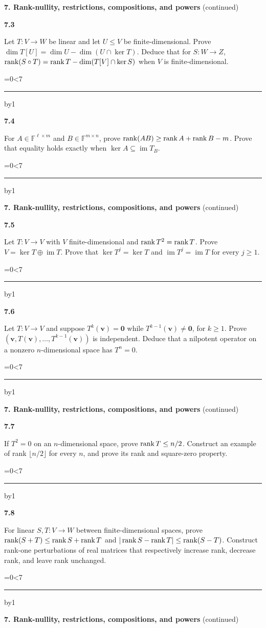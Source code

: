 \documentclass[11pt,letterpaper]{article}
\newcommand{\topicshort}{Problem collection}
\newcommand{\F}{\mathbb F}\newcommand{\R}{\mathbb R}\newcommand{\Q}{\mathbb Q}\newcommand{\C}{\mathbb C}\newcommand{\Z}{\mathbb Z}
\newcommand{\ruled}[1]{\par\begingroup\parskip=0pt\baselineskip=17pt\count255=0\loop\ifnum\count255<#1\noindent\textcolor{black!17}{\rule{\linewidth}{.25pt}}\par\advance\count255 by1\repeat\endgroup}
\newcommand{\problem}[4]{\noindent\begin{minipage}[t][3.48in][t]{\linewidth}\textbf{\color{navy}#1}\quad{\small\sffamily\color{teal}#2#3}\par #4\par\vfill\ruled{7}\end{minipage}}
\begin{document}
\newpage
\renewcommand{\topicshort}{Rank and powers}
{\large\bfseries\color{navy}7. Rank-nullity, restrictions, compositions, and powers} {\small(continued)}\par\vspace{9pt}
\problem{7.3}{M}{ / $\star$}{Let $T:V\to W$ be linear and let $U\le V$ be finite-dimensional. Prove $\dim T[U]=\dim U-\dim(U\cap\ker T)$. Deduce that for $S:W\to Z$, $\operatorname{rank}(S\circ T)=\operatorname{rank} T-\dim(T[V]\cap\ker S)$ when $V$ is finite-dimensional.}
\par\vspace{14pt}
\problem{7.4}{M}{}{For $A\in\F^{\ell\times m}$ and $B\in\F^{m\times n}$, prove $\operatorname{rank}(AB)\ge\operatorname{rank} A+\operatorname{rank} B-m$. Prove that equality holds exactly when $\ker A\subseteq\operatorname{im}T_B$.}
\newpage
\renewcommand{\topicshort}{Rank and powers}
{\large\bfseries\color{navy}7. Rank-nullity, restrictions, compositions, and powers} {\small(continued)}\par\vspace{9pt}
\problem{7.5}{M}{}{Let $T:V\to V$ with $V$ finite-dimensional and $\operatorname{rank} T^2=\operatorname{rank} T$. Prove $V=\ker T\oplus\operatorname{im}T$. Prove that $\ker T^j=\ker T$ and $\operatorname{im}T^j=\operatorname{im}T$ for every $j\ge1$.}
\par\vspace{14pt}
\problem{7.6}{M}{}{Let $T:V\to V$ and suppose $T^k(\mathbf v)=\mathbf0$ while $T^{k-1}(\mathbf v)\ne\mathbf0$, for $k\ge1$. Prove $(\mathbf v,T(\mathbf v),\ldots,T^{k-1}(\mathbf v))$ is independent. Deduce that a nilpotent operator on a nonzero $n$-dimensional space has $T^n=0$.}
\newpage
\renewcommand{\topicshort}{Rank and powers}
{\large\bfseries\color{navy}7. Rank-nullity, restrictions, compositions, and powers} {\small(continued)}\par\vspace{9pt}
\problem{7.7}{M}{}{If $T^2=0$ on an $n$-dimensional space, prove $\operatorname{rank} T\le n/2$. Construct an example of rank $\lfloor n/2\rfloor$ for every $n$, and prove its rank and square-zero property.}
\par\vspace{14pt}
\problem{7.8}{M}{}{For linear $S,T:V\to W$ between finite-dimensional spaces, prove $\operatorname{rank}(S+T)\le\operatorname{rank} S+\operatorname{rank} T$ and $|\operatorname{rank} S-\operatorname{rank} T|\le\operatorname{rank}(S-T)$. Construct rank-one perturbations of real matrices that respectively increase rank, decrease rank, and leave rank unchanged.}
\newpage
\renewcommand{\topicshort}{Rank and powers}
{\large\bfseries\color{navy}7. Rank-nullity, restrictions, compositions, and powers} {\small(continued)}\par\vspace{9pt}
\end{document}

